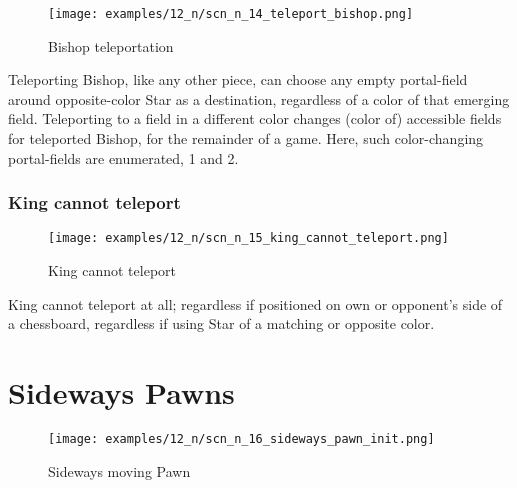 \vspace*{-1.4\baselineskip}
\noindent
\begin{figure}[!h]
\texttt{[image: examples/12\_n/scn\_n\_14\_teleport\_bishop.png]}
\caption{Bishop teleportation}
\label{fig:scn_n_14_teleport_bishop}
\end{figure}

Teleporting Bishop, like any other piece, can choose any empty portal-field
around opposite-color Star as a destination, regardless of a color of that
emerging field. Teleporting to a field in a different color changes (color of)
accessible fields for teleported Bishop, for the remainder of a game. Here,
such color-changing portal-fields are enumerated, 1 and 2.

\clearpage %

\subsubsection*{King cannot teleport}
\label{sec:Nineteen/Star/Teleporting pieces/King cannot teleport}

\vspace*{-1.4\baselineskip}
\noindent
\begin{figure}[!h]
\texttt{[image: examples/12\_n/scn\_n\_15\_king\_cannot\_teleport.png]}
\caption{King cannot teleport}
\label{fig:scn_n_15_king_cannot_teleport}
\end{figure}

King cannot teleport at all; regardless if positioned on own or opponent's side
of a chessboard, regardless if using Star of a matching or opposite color.

\clearpage %

\section*{Sideways Pawns}
\label{sec:Nineteen/Sideways Pawns}

\vspace*{-1.5\baselineskip}
\noindent
\begin{figure}[!h]
\texttt{[image: examples/12\_n/scn\_n\_16\_sideways\_pawn\_init.png]}
\vspace*{-1.4\baselineskip}
\caption{Sideways moving Pawn}
\label{fig:scn_n_16_sideways_pawn_init}
\end{figure}

